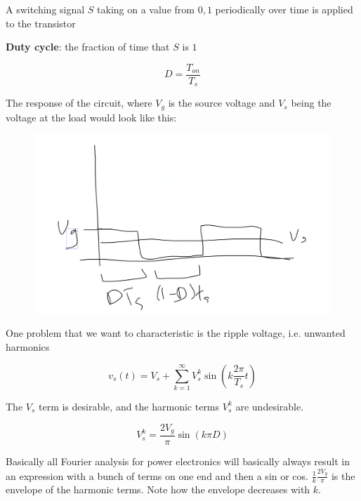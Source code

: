 \documentclass[../notes.tex]{subfiles}
\begin{document}
A switching signal $ S $ taking on a value from $ {0, 1} $  periodically over time is applied to the transistor

\begin{definition}
	\textbf{Duty cycle}: the fraction of time that $ S $ is $ 1 $

	\begin{equation}
		D = \frac{T_{on} }{T_s}
	\end{equation}
	
\end{definition}


The response of the circuit, where $ V_g $  is the source voltage and $ V_s $  being the voltage at the load would look like this:

\begin{figure}[H]
	\centering
	\includegraphics[width=0.8\linewidth]{img/image_2022-09-23-15-26-24.png}
\end{figure}


One problem that we want to characteristic is the ripple voltage, i.e. unwanted harmonics  


\begin{equation}
	v_s(t) = V_s + \sum^{\infty}_{k=1} V_s^k \sin (k \frac{2\pi}{T_s} t)
\end{equation}

The $ V_s $  term is desirable, and the harmonic terms $ V_s^k $ are undesirable.   

\begin{equation}
	V_s^k = \frac{2V_g}{\pi} \sin (k\pi D)
\end{equation}

Basically all Fourier analysis for power electronics will basically always result in an expression with a bunch of terms on one end and then a sin or cos.
$ \frac{1}{k} \frac{2V_g}{\pi} $  is the envelope of the harmonic terms. Note how the envelope decreases with $ k $.
\end{document}
